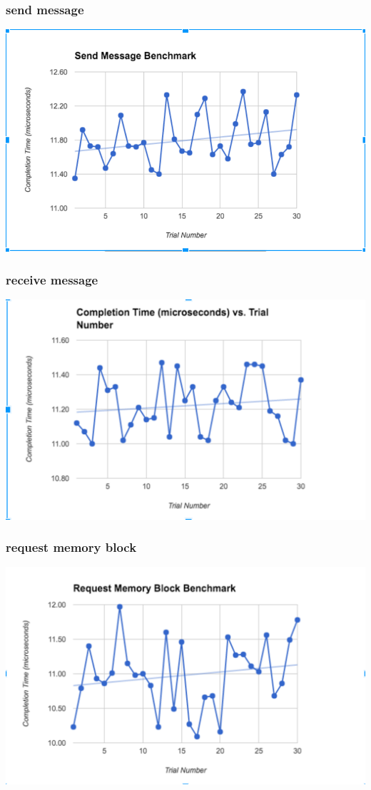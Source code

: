 \documentclass[12pt]{article}
\begin{document}
\subsubsection{send message}
\includegraphics[scale=1]{pic1.png} 
\subsubsection{receive message}
\includegraphics[scale=0.8]{pic2.png} 
\subsubsection{request memory block}
\includegraphics[scale=0.7]{pic3.png} 
\newpage
\end{document}
